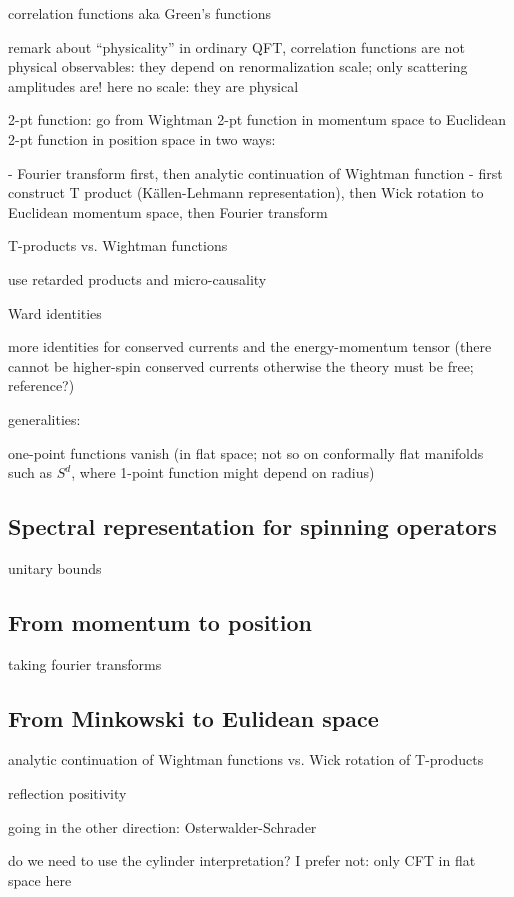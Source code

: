 \documentclass[a4paper,12pt]{article}
\numberwithin{equation}{section}
\begin{document}
correlation functions aka Green's functions

remark about ``physicality''
in ordinary QFT, correlation functions are not physical observables: they depend on renormalization scale; only scattering amplitudes are!
here no scale: they are physical


2-pt function: go from Wightman 2-pt function in momentum space to Euclidean 2-pt function in position space in two ways:

- Fourier transform first, then analytic continuation of Wightman function
- first construct T product (Källen-Lehmann representation), then Wick rotation to Euclidean momentum space, then Fourier transform



T-products vs. Wightman functions

use retarded products and micro-causality


Ward identities

more identities for conserved currents and the energy-momentum tensor
(there cannot be higher-spin conserved currents otherwise the theory must be free; reference?)


generalities:

one-point functions vanish (in flat space; not so on conformally flat manifolds such as $S^d$, where 1-point function might depend on radius)

\subsection{Spectral representation for spinning operators}

unitary bounds

\subsection{From momentum to position}

taking fourier transforms

\subsection{From Minkowski to Eulidean space}

analytic continuation of Wightman functions vs. Wick rotation of T-products

reflection positivity


going in the other direction: Osterwalder-Schrader


do we need to use the cylinder interpretation?
I prefer not: only CFT in flat space here
\end{document}

